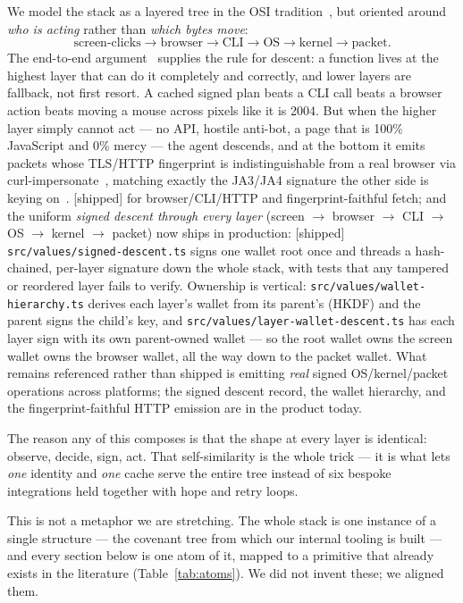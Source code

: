 \documentclass[11pt]{article}
\newcommand{\impl}{\textcolor{green!55!black}{\small[shipped]}}
\begin{document}
We model the stack as a layered tree in the OSI tradition~\cite{osi}, but oriented
around \emph{who is acting} rather than \emph{which bytes move}:
\[
\text{screen-clicks} \to \text{browser} \to \text{CLI} \to \text{OS} \to
\text{kernel} \to \text{packet}.
\]
The end-to-end argument~\cite{e2e} supplies the rule for descent: a function lives
at the highest layer that can do it completely and correctly, and lower layers are
fallback, not first resort. A cached signed plan beats a CLI call beats a browser
action beats moving a mouse across pixels like it is 2004. But when the higher
layer simply cannot act --- no API, hostile anti-bot, a page that is 100\% JavaScript
and 0\% mercy --- the agent descends, and at the bottom it emits packets whose
TLS/HTTP fingerprint is indistinguishable from a real browser via
curl-impersonate~\cite{curlimpersonate}, matching exactly the JA3/JA4 signature
the other side is keying on~\cite{ja3,ja4}. \impl{} for browser/CLI/HTTP and
fingerprint-faithful fetch; and the uniform \emph{signed descent through every
layer} (screen $\to$ browser $\to$ CLI $\to$ OS $\to$ kernel $\to$ packet) now ships
in production: \impl{} \texttt{src/values/signed-descent.ts} signs one wallet root
once and threads a hash-chained, per-layer signature down the whole stack, with tests
that any tampered or reordered layer fails to verify. Ownership is vertical:
\texttt{src/values/wallet-hierarchy.ts} derives each layer's wallet from its parent's
(HKDF) and the parent signs the child's key, and \texttt{src/values/layer-wallet-descent.ts}
has each layer sign with its own parent-owned wallet --- so the root wallet owns the
screen wallet owns the browser wallet, all the way down to the packet wallet. What
remains referenced rather than shipped is emitting \emph{real} signed OS/kernel/packet
operations across platforms; the signed descent record, the wallet hierarchy, and the
fingerprint-faithful HTTP emission are in the product today.

The reason any of this composes is that the shape at every layer is identical:
observe, decide, sign, act. That self-similarity is the whole trick --- it is what
lets \emph{one} identity and \emph{one} cache serve the entire tree instead of six
bespoke integrations held together with hope and retry loops.

This is not a metaphor we are stretching. The whole stack is one instance of a
single structure --- the covenant tree from which our internal tooling is built ---
and every section below is one atom of it, mapped to a primitive that already
exists in the literature (Table~\ref{tab:atoms}). We did not invent these; we
aligned them.
\end{document}
